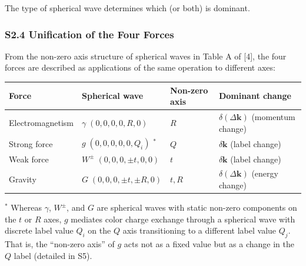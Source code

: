 \documentclass[
  a4paper,11pt]{article}
\newcounter{none}
\theoremstyle{definition}
\theoremstyle{remark}
\begin{document}
The type of spherical wave determines which (or both) is dominant.

\subsubsection{S2.4 Unification of the Four
Forces}\label{s2.4-unification-of-the-four-forces}

From the non-zero axis structure of spherical waves in Table A of
{[}4{]}, the four forces are described as applications of the same
operation to different axes:

{\def\LTcaptype{none} %
\begin{longtable}[]{@{}
  >{\raggedright\arraybackslash}p{}
  >{\raggedright\arraybackslash}p{}
  >{\raggedright\arraybackslash}p{}
  >{\raggedright\arraybackslash}p{}@{}}
\toprule\noalign{}
\begin{minipage}[b]{\linewidth}\raggedright
Force
\end{minipage} & \begin{minipage}[b]{\linewidth}\raggedright
Spherical wave
\end{minipage} & \begin{minipage}[b]{\linewidth}\raggedright
Non-zero axis
\end{minipage} & \begin{minipage}[b]{\linewidth}\raggedright
Dominant change
\end{minipage} \\
\midrule\noalign{}
\endhead
\bottomrule\noalign{}
\endlastfoot
Electromagnetism & \(\gamma\; (0,0,0,0,R,0)\) & \(R\) &
\(\delta(\Delta\mathbf{k})\) (momentum change) \\
Strong force & \(g\; (0,0,0,0,0,Q_i)\) \({}^{*}\) & \(Q\) &
\(\delta\mathbf{k}\) (label change) \\
Weak force & \(W^{\pm}\; (0,0,0,\pm t,0,0)\) & \(t\) &
\(\delta\mathbf{k}\) (label change) \\
Gravity & \(G\; (0,0,0,\pm t,\pm R,0)\) & \(t, R\) &
\(\delta(\Delta\mathbf{k})\) (energy change) \\
\end{longtable}
}

\({}^{*}\) Whereas \(\gamma\), \(W^{\pm}\), and \(G\) are spherical
waves with static non-zero components on the \(t\) or \(R\) axes, \(g\)
mediates color charge exchange through a spherical wave with discrete
label value \(Q_i\) on the \(Q\) axis transitioning to a different label
value \(Q_j\). That is, the ``non-zero axis'' of \(g\) acts not as a
fixed value but as a change in the \(Q\) label (detailed in S5).
\end{document}

